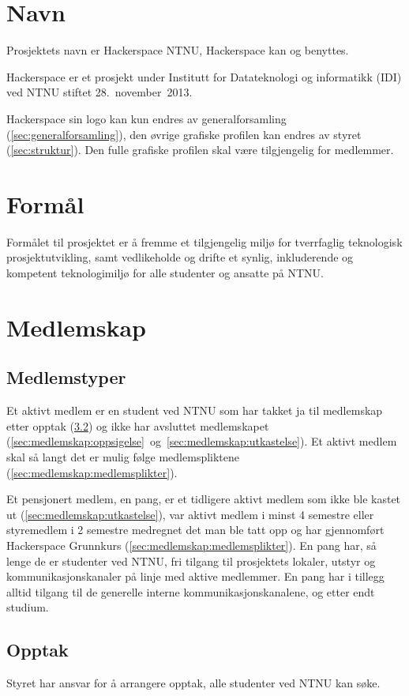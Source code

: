 \section{Navn}\label{sec:navn}
Prosjektets navn er Hackerspace NTNU, Hackerspace kan og benyttes.

Hackerspace er et prosjekt under Institutt for Datateknologi og informatikk (IDI) ved NTNU stiftet 28.~november~2013.

Hackerspace sin logo kan kun endres av generalforsamling (\ref{sec:generalforsamling}), den øvrige grafiske profilen kan endres av styret (\ref{sec:struktur}). Den fulle grafiske profilen skal være tilgjengelig for medlemmer.


\section{Formål}\label{sec:formål}
Formålet til prosjektet er å fremme et tilgjengelig miljø for tverrfaglig teknologisk prosjektutvikling, samt vedlikeholde og drifte et synlig, inkluderende og kompetent teknologimiljø for alle studenter og ansatte på NTNU.\@

\section{Medlemskap}\label{sec:medlemskap}
\subsection{Medlemstyper}\label{sec:medlemskap:medlemstyper}
Et aktivt medlem er en student ved NTNU som har takket ja til medlemskap etter opptak (\ref{sec:medlemskap:opptak}) og ikke har avsluttet medlemskapet (\ref{sec:medlemskap:oppsigelse}~og~\ref{sec:medlemskap:utkastelse}).
Et aktivt medlem skal så langt det er mulig følge medlemspliktene (\ref{sec:medlemskap:medlemsplikter}).

Et pensjonert medlem, en pang, er et tidligere aktivt medlem som ikke ble kastet ut (\ref{sec:medlemskap:utkastelse}), var aktivt medlem i minst 4 semestre eller styremedlem i 2 semestre medregnet det man ble tatt opp og har gjennomført Hackerspace Grunnkurs (\ref{sec:medlemskap:medlemsplikter}).
En pang har, så lenge de er studenter ved NTNU, fri tilgang til prosjektets lokaler, utstyr og kommunikasjonskanaler på linje med aktive medlemmer.
En pang har i tillegg alltid tilgang til de generelle interne kommunikasjonskanalene, og etter endt studium.

\subsection{Opptak}\label{sec:medlemskap:opptak}
Styret har ansvar for å arrangere opptak, alle studenter ved NTNU kan søke.

